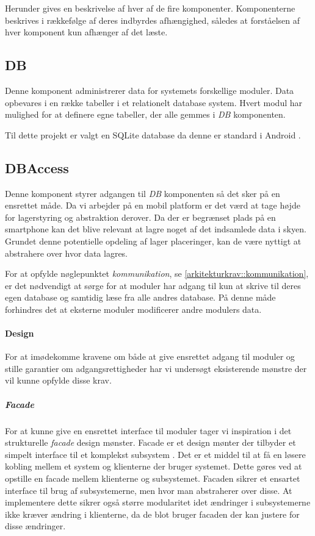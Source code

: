 Herunder gives en beskrivelse af hver af de fire komponenter.
Komponenterne beskrives i rækkefølge af deres indbyrdes afhængighed, således at forståelsen af hver komponent kun afhænger af det læste.

\subsection{DB}
Denne komponent administrerer data for systemets forskellige moduler.
Data opbevares i en række tabeller i et relationelt database system.
Hvert modul har mulighed for at definere egne tabeller, der alle gemmes i \textit{DB} komponenten.

Til dette projekt er valgt en SQLite database da denne er standard i Android \cite{android_database}.


\subsection{DBAccess}\label{subsec:DBACCESS}
Denne komponent styrer adgangen til \textit{DB} komponenten så det sker på en ensrettet måde.
Da vi arbejder på en mobil platform er det værd at tage højde for lagerstyring og abstraktion derover.
Da der er begrænset plads på en smartphone kan det blive relevant at lagre noget af det indsamlede data i skyen.
Grundet denne potentielle opdeling af lager placeringer, kan de være nyttigt at abstrahere over hvor data lagres.

For at opfylde nøglepunktet \textit{kommunikation}, se \cref{arkitekturkrav::kommunikation}, er det nødvendigt at sørge for at moduler har adgang til kun at skrive til deres egen database og samtidig læse fra alle andres database.
På denne måde forhindres det at eksterne moduler modificerer andre modulers data.

\paragraph{Design} 
For at imødekomme kravene om både at give ensrettet adgang til moduler og stille garantier om adgangsrettigheder har vi undersøgt eksisterende mønstre der vil kunne opfylde disse krav.

\subparagraph{Facade}
For at kunne give en ensrettet interface til moduler tager vi inspiration i det strukturelle \textit{facade} design mønster.
Facade er et design mønter der tilbyder et simpelt interface til et komplekst subsystem \citep{gamma1994design}. 
Det er et middel til at få en løsere kobling mellem et system og klienterne der bruger systemet.
Dette gøres ved at opstille en facade mellem klienterne og subsystemet.
Facaden sikrer et ensartet interface til brug af subsystemerne, men hvor man abstraherer over disse.
At implementere dette sikrer også større modularitet idet ændringer i subsystemerne ikke kræver ændring i klienterne, da de blot bruger facaden der kan justere for disse ændringer.

